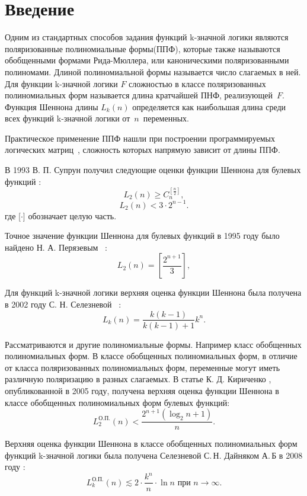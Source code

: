 \documentclass[a4paper, 14pt]{extarticle}
\begin{document}


\setcounter{secnumdepth}{-1}

\section{Введение}
Одним из стандартных способов задания функций k\nobreakdash-значной логики являются поляризованные полиномиальные формы(ППФ),
которые также называются обобщенными формами Рида-Мюллера, или каноническими поляризованными полиномами.
Длиной полиномиальной формы называется число слагаемых в ней. Для функции k\nobreakdash-значной логики $F$ сложностью в классе
поляризованных полиномиальных форм называется длина кратчайшей ПНФ, реализующей~$F$.
Функция Шеннона длины $L_k(n)$ определяется как наибольшая длина среди всех функций k\nobreakdash-значной логики от~$n$~переменных.

Практическое применение ППФ нашли при построении программируемых логических матриц~\cite{ue04}, сложность которых
напрямую зависит от длины ППФ.

В 1993  В. П. Супрун \cite{sv93} получил следующие оценки функции Шеннона для булевых функций :
$$
L_2(n) \geqslant C_n^{[\frac{n}{2}]},
$$
$$
L_2(n) < 3 \cdot 2^{n-1}.
$$
где [$\cdot$] обозначает целую часть.

Точное значение функции Шеннона для булевых функций в 1995 году было
найдено Н. А. Перязевым~\cite{pn95} :
$$
L_2(n) = \left[\frac{2^{n+1}}{3}\right],
$$

Для функций k\nobreakdash-значной логики верхняя оценка функции Шеннона была получена в 2002 году С. Н. Селезневой~\cite{ss02} :
$$
L_k(n) = \frac{k(k-1)}{k(k-1)+1}k^n.
$$

Рассматриваются и другие полиномиальные формы. Например класс обобщенных полиномиальных форм.
В классе обобщенных полиномиальных форм, в отличие от класса поляризованных полиномиальных форм, переменные могут иметь
различную поляризацию в разных слагаемых. В статье К. Д. Кириченко \cite{kk05}, опубликованной в 2005 году, получена верхняя оценка
функции Шеннона в классе обобщенных полиномиальных форм булевых функций:
$$
L^{\text{О.П.}}_2(n) < \frac{2 ^ {n + 1}(\log_2n+1)}{n}.
$$

Верхняя оценка функции Шеннона в классе обобщенных полиномиальных форм функций k\nobreakdash-значной логики была получена
Селезневой С.\,Н. Дайняком А.\,Б в 2008 году \cite{sd08}:
$$
L^{\text{О.П.}}_k(n) \lesssim 2\cdot\frac{k ^ n}{n}\cdot \ln n \text{ при } n \rightarrow \infty.
$$
\end{document}
